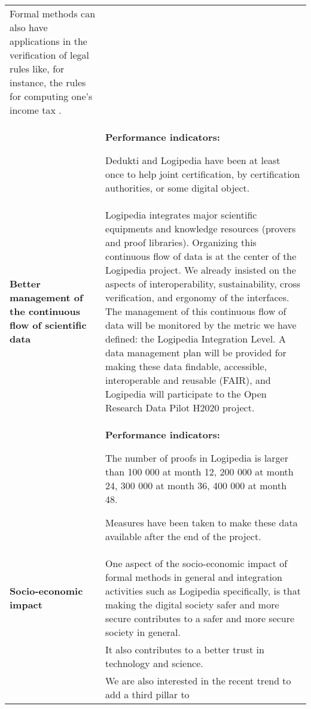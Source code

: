 \begin{longtable}{|p{}|p{}|}
Formal methods can also have applications in the verification of legal
rules like, for instance, the rules for computing one's income tax
\cite{merigoux20jfla}.
\\
&
\colorbox{color2}{\bf Performance indicators:}
\begin{compactitem}
\item Dedukti and Logipedia have been at least once to help joint
certification, by certification authorities, or some digital object.
\end{compactitem}
\\
\hline
{\bf Better management of the continuous flow of scientific data}
&
Logipedia integrates major scientific equipments and knowledge
resources (provers and proof libraries).  Organizing this continuous
flow of data is at the center of the Logipedia project. We already
insisted on the aspects of interoperability, sustainability, cross
verification, and ergonomy of the interfaces.  The management of this
continuous flow of data will be monitored by the metric we have
defined: the Logipedia Integration Level.  A data management plan will
be provided for making these data findable, accessible, interoperable
and reusable (FAIR), and Logipedia will participate to the Open
Research Data Pilot H2020 project.
\\
&
\colorbox{color2}{\bf Performance indicators:}
\begin{compactitem}
\item The number of proofs in Logipedia is larger than 100 000 at month 12,
  200 000 at month 24, 300 000 at month 36, 400 000 at month 48.
\item Measures have been taken to make these data available after the end
  of the project.
\end{compactitem}
\\
\hline
{\bf Socio-economic impact}
&
One aspect of the socio-economic impact of formal methods in general
and integration activities such as Logipedia specifically, is that making the
digital society safer and more secure contributes to a safer and more
secure society in general.\\
&
\hspace{0.4cm}
It also contributes to a better trust in technology and science.\\
&
\hspace{0.4cm} 
We are also interested in the recent trend to add a third pillar to

\end{longtable}
